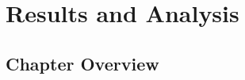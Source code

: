 \chapter{Results and Analysis}
\label{chap:results}

\section{Chapter Overview}
\label{sec:results-overview}

